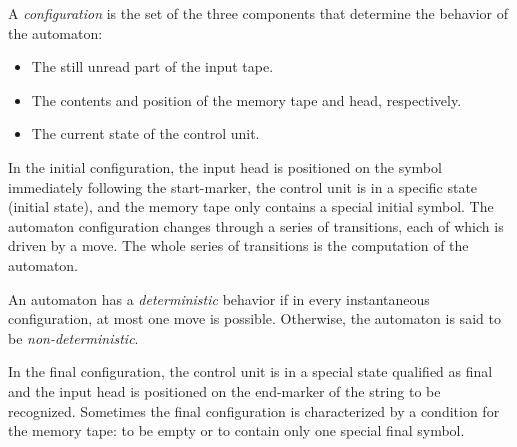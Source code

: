 \begin{definition}
    A \emph{configuration}  is the set of the three components that determine the behavior of the automaton: 
    \begin{itemize}
        \item The still unread part of the input tape. 
        \item The contents and position of the memory tape and head, respectively. 
        \item The current state of the control unit.
    \end{itemize}
\end{definition}
In the initial configuration, the input head is positioned on the symbol immediately following the start-marker, the control unit is in a specific state (initial state), and the memory tape only contains a special initial symbol. 
The automaton configuration changes through a series of transitions, each of which is driven by a move. 
The whole series of transitions is the computation of the automaton.
\begin{definition}
    An automaton has a \emph{deterministic} behavior if in every instantaneous configuration, at most one move is possible. 
    Otherwise, the automaton is said to be \emph{non-deterministic}.
\end{definition}
In the final configuration, the control unit is in a special state qualified as final and the input head is positioned on the end-marker of the string to be recognized.
Sometimes the final configuration is characterized by a condition for the memory tape: to be empty or to contain only one special final symbol.






